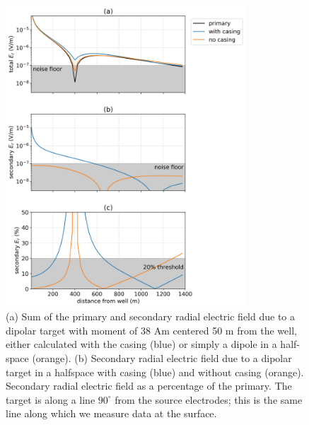 \begin{figure}
    \begin{center}
    \includegraphics[width=0.8\textwidth]{figures/detectability_dipole.png}
    \end{center}
\caption{
    (a) Sum of the primary and secondary radial electric field due to a dipolar
    target with moment of 38 Am
    centered 50 m from the well, either calculated with the
    casing (blue) or simply a dipole in a half-space (orange). (b) Secondary
    radial electric field due to a dipolar target in a halfspace with casing (blue) and without casing (orange).
    Secondary radial electric field as a percentage of the primary.
    The target is along a line $90^\circ$ from the
    source electrodes; this is the same line along which we measure data at the surface.
}
\label{fig:detectability_dipole}
\end{figure}
